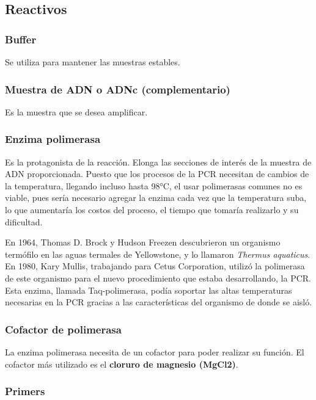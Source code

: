\subsection{Reactivos}

\subsubsection{Buffer}
Se utiliza para mantener las muestras estables.

\subsubsection{Muestra de ADN o ADNc (complementario)}

Es la muestra que se desea amplificar.

\subsubsection{Enzima polimerasa}

Es la protagonista de la reacción. Elonga las secciones de interés de la muestra de ADN proporcionada. Puesto que los procesos de la PCR necesitan de cambios de la temperatura, llegando incluso hasta 98°C, el usar polimerasas comunes no es viable, pues sería necesario agregar la enzima cada vez que la temperatura suba, lo que aumentaría los costos del proceso, el tiempo que tomaría realizarlo y su dificultad.

En 1964, Thomas D. Brock y Hudson Freezen descubrieron un organismo termófilo en las aguas termales de Yellowstone, y lo llamaron \textit{Thermus aquaticus}. En 1980, Kary Mullis, trabajando para Cetus Corporation, utilizó la polimerasa de este organismo para el nuevo procedimiento que estaba desarrollando, la PCR. Esta enzima, llamada Taq-polimerasa, podía soportar las altas temperaturas necesarias en la PCR gracias a las características del organismo de donde se aisló.

\subsubsection{Cofactor de polimerasa}

La enzima polimerasa necesita de un cofactor para poder realizar su función. El cofactor más utilizado es el \textbf{cloruro de magnesio (MgCl2)}.

\subsubsection{Primers}

